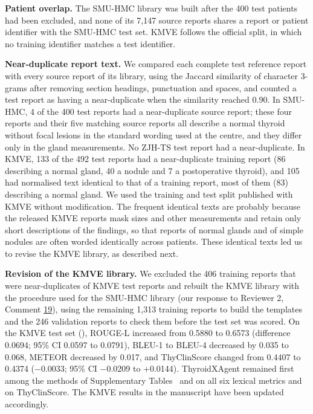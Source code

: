 \textbf{Patient overlap.} The SMU-HMC library was built after the 400 test patients had been excluded, and none of its 7,147 source reports shares a report or patient identifier with the SMU-HMC test set. KMVE follows the official split, in which no training identifier matches a test identifier.\par

\textbf{Near-duplicate report text.} We compared each complete test reference report with every source report of its library, using the Jaccard similarity of character 3-grams after removing section headings, punctuation and spaces, and counted a test report as having a near-duplicate when the similarity reached 0.90. In SMU-HMC, 4 of the 400 test reports had a near-duplicate source report; these four reports and their five matching source reports all describe a normal thyroid without focal lesions in the standard wording used at the centre, and they differ only in the gland measurements. No ZJH-TS test report had a near-duplicate. In KMVE, 133 of the 492 test reports had a near-duplicate training report (86 describing a normal gland, 40 a nodule and 7 a postoperative thyroid), and 105 had normalised text identical to that of a training report, most of them (83) describing a normal gland. We used the training and test split published with KMVE without modification. The frequent identical texts are probably because the released KMVE reports mask sizes and other measurements and retain only short descriptions of the findings, so that reports of normal glands and of simple nodules are often worded identically across patients. These identical texts led us to revise the KMVE library, as described next.\par

\textbf{Revision of the KMVE library.} We excluded the 406 training reports that were near-duplicates of KMVE test reports and rebuilt the KMVE library with the procedure used for the SMU-HMC library (our response to Reviewer 2, Comment \hyperref[rev:R2.19]{19}), using the remaining 1,313 training reports to build the templates and the 246 validation reports to check them before the test set was scored. On the KMVE test set (), ROUGE-L increased from 0.5880 to 0.6573 (difference 0.0694; 95\% CI 0.0597 to 0.0791), BLEU-1 to BLEU-4 decreased by 0.035 to 0.068, METEOR decreased by 0.017, and ThyClinScore changed from 0.4407 to 0.4374 ($-$0.0033; 95\% CI $-$0.0209 to +0.0144). ThyroidXAgent remained first among the methods of Supplementary Tables~\SuppTabNLG{} and \SuppTabClinical{} on all six lexical metrics and on ThyClinScore. The KMVE results in the manuscript have been updated accordingly.\par

